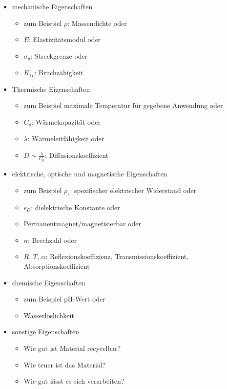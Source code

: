 \documentclass[11pt,a4paper]{article}
\numberwithin{equation}{section}
\numberwithin{figure}{section}
\begin{document}
\indent \begin{itemize}
\item mechanische Eigenschaften
\begin{itemize}
    \item zum Beispiel $\rho$: Massendichte oder
    \item $E$: Elastizitätsmodul oder 
    \item $\sigma_y$: Streckgrenze oder
    \item $K_{1c}$: Bruchzähigkeit
\end{itemize}
    \item Thermische Eigenschaften
    \begin{itemize}
        \item  zum Beispiel maximale Temperatur für gegebene Anwendung oder
        \item $C_p$: Wärmekapazität oder
        \item $\lambda$: Wärmeleitfähigkeit oder
        \item $D \sim \frac{\lambda}{C_p}$: Diffusionskoeffizient
    \end{itemize}
    \item elektrische, optische und magnetische Eigenschaften
    \begin{itemize}
        \item zum Beispiel $\rho_e$: spezifischer elektrischer Widerstand oder
        \item $\epsilon_D$: dielektrische Konstante oder
        \item Permanentmagnet/magnetisierbar oder 
        \item $n$: Brechzahl oder
        \item $R$, $T$, $\alpha$: Reflexionskoeffizienz, Transmissionskoeffizient, Absorptionskoeffizient
    \end{itemize}
    \item chemische Eigenschaften
    \begin{itemize}
        \item zum Beispiel pH-Wert oder
        \item Wasserlöslichkeit 
    \end{itemize}
    \item sonstige Eigenschaften
    \begin{itemize}
        \item Wie gut ist Material recycelbar? 
        \item Wie teuer ist das Material?
        \item Wie gut lässt es sich verarbeiten?
    \end{itemize}
\end{itemize}
\end{document}
